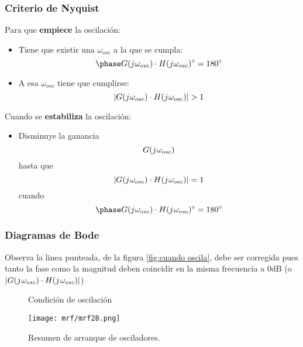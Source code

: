 \documentclass[
	12pt, %
	fleqn, %
	a4paper, %
	oneside, %
]{LegrandOrangeBook}
\begin{document}
\subsubsection*{Criterio de Nyquist}
Para que \textbf{empiece} la oscilación:
\begin{itemize}
\item Tiene que existir una $\omega_{osc}$ a la que se cumpla:
\begin{displaymath}
\fase{}{G(\iu\omega_{osc})\cdot H(\iu\omega_{osc})}=180^{\circ}
\end{displaymath}
\item A esa $\omega_{osc}$ tiene que cumplirse:
\begin{displaymath}
|G(\iu\omega_{osc})\cdot H(\iu\omega_{osc})|>1
\end{displaymath}
\end{itemize}
Cuando se \textbf{estabiliza} la oscilación:
\begin{itemize}
\item Disminuye la ganancia
\begin{displaymath}
G({j\mkern1mu}\omega_{osc})
\end{displaymath}
hasta que
\begin{displaymath}
|G({j\mkern1mu}\omega_{osc})\cdot H({j\mkern1mu}\omega_{osc})|=1
\end{displaymath}
cuando
\begin{displaymath}
\fase{}{G(\iu\omega_{osc})\cdot H(\iu\omega_{osc})}=180^{\circ}
\end{displaymath}
\end{itemize}
\subsubsection*{Diagramas de Bode}
Observa la linea punteada, de la figura \ref{fig:cuando oscila}, debe ser corregida pues tanto la fase como la magnitud deben coincidir en la misma frecuencia a 0dB (o $|G({j\mkern1mu}\omega_{osc})\cdot H({j\mkern1mu}\omega_{osc})|$)
\begin{figure}[]
\centering
{}
\caption{Condición de oscilación}
\end{figure}
\begin{figure}[H]
\centering
\texttt{[image: mrf/mrf28.png]}
\caption{Resumen de arranque de osciladores.}
\end{figure}
\end{document}
